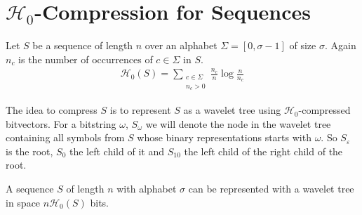 \section{$\mathcal{H}_0$-Compression for Sequences}

\begin{Definition}
  Let $S$ be a sequence of length $n$ over an alphabet $\Sigma = [0, \sigma - 1]$ of size $\sigma$. Again $n_c$ is the number of occurrences of $c \in \Sigma$ in $S$.
  \begin{align}
    \mathcal{H}_0(S) = \sum\limits_{\substack{c \in \Sigma\\ n_c > 0}} \frac{n_c}{n}\log\frac{n}{n_c}
  \end{align}
\end{Definition}

The idea to compress $S$ is to represent $S$ as a wavelet tree using $\mathcal{H}_0$-compressed bitvectors. For a bitstring $\omega$, $S_\omega$ we will denote the node in the wavelet tree containing all symbols from $S$ whose binary representations starts with $\omega$. So $S_\varepsilon$ is the root, $S_0$ the left child of it and $S_{10}$ the left child of the right child of the root.

\begin{Theorem}
  A sequence $S$ of length $n$ with alphabet $\sigma$ can be represented with a wavelet tree in space $n\mathcal{H}_0(S)$ bits.
\end{Theorem}

